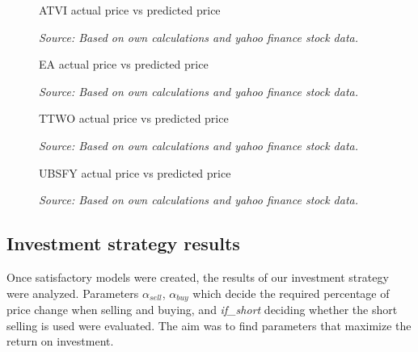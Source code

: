 \documentclass[11pt]{article} %
\begin{document}
\begin{figure}[H]
\caption{ATVI actual price vs predicted price}
\begin{adjustbox}{width=1.3\textwidth,center}

\end{adjustbox}
\caption*{\textit{Source: Based on own calculations and yahoo finance stock data.}}
\end{figure}

\begin{figure}[H]
\caption{EA actual price vs predicted price}
\begin{adjustbox}{width=1.3\textwidth,center}

\end{adjustbox}
\caption*{\textit{Source: Based on own calculations and yahoo finance stock data.}}
\end{figure}

\begin{figure}[H]
\caption{TTWO actual price vs predicted price}
\begin{adjustbox}{width=1.3\textwidth,center}

\end{adjustbox}
\caption*{\textit{Source: Based on own calculations and yahoo finance stock data.}}
\end{figure}

\begin{figure}[H]
\caption{UBSFY actual price vs predicted price}
\begin{adjustbox}{width=1.3\textwidth,center}

\end{adjustbox}
\caption*{\textit{Source: Based on own calculations and yahoo finance stock data.}}
\end{figure}

\subsection{Investment strategy results}
Once satisfactory models were created, the results of our investment strategy were analyzed. Parameters  $\alpha_{sell}$, $\alpha_{buy}$  which decide the required percentage of price change when selling and buying, and \textit{if\_short} deciding whether the short selling is used were evaluated. The aim was to find parameters that maximize the return on investment.
\end{document}
